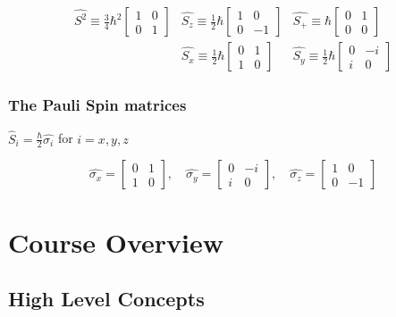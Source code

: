 \documentclass{article}
\begin{document}
$$
\begin{array}{ccc}
\widehat{S^{2}} \equiv \frac{3}{4} \hbar^{2}\left[\begin{array}{ll}
1 & 0 \\
0 & 1
\end{array}\right] & \widehat{S_{z}} \equiv \frac{1}{2} \hbar\left[\begin{array}{cc}
1 & 0 \\
0 & -1
\end{array}\right] & \widehat{S_{+}} \equiv \hbar\left[\begin{array}{ll}
0 & 1 \\
0 & 0
\end{array}\right] \\
& \widehat{S_{x}} \equiv \frac{1}{2} \hbar\left[\begin{array}{ll}
0 & 1 \\
1 & 0
\end{array}\right] & \widehat{S_{y}} \equiv \frac{1}{2} \hbar\left[\begin{array}{cc}
0 & -i \\
i & 0
\end{array}\right]
\end{array}
$$

\subsubsection{The Pauli Spin matrices}

$\hat{S}_i = \frac{\hbar}{2} \hat{\sigma_i}$ for $i = x,y,z$

$$\hat{\sigma_x} = \begin{bmatrix} 0 & 1 \\ 1 & 0 \end{bmatrix}, \quad 
\hat{\sigma_y} = \begin{bmatrix} 0 & -i \\ i & 0 \end{bmatrix}, \quad 
\hat{\sigma_z} = \begin{bmatrix} 1 & 0 \\ 0 & -1 \end{bmatrix}$$

\section{Course Overview}

\subsection{High Level Concepts}
\end{document}
